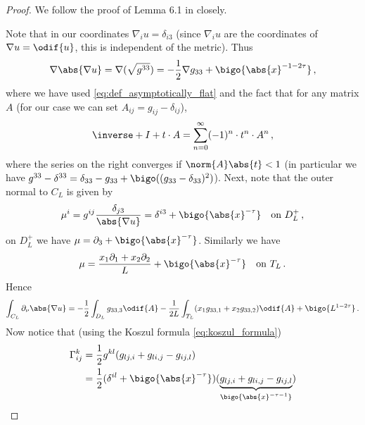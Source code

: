 \documentclass[titlepage,numbers=noenddot,oneside,%
cleardoublepage=empty,paper=a4,fontsize=11pt,%
english,%
]{scrartcl}
\newcommand*{\mathcomma}{\,,}
\newcommand*{\mathfullstop}{\,.}
\begin{document}
\begin{proof}
    We follow the proof of Lemma 6.1 in \cite{brayHarmonicFunctionsMass2019} closely.

    Note that in our coordinates \( \nabla_i u=\delta_{i3} \) (since \( \nabla_i u \) are the coordinates of \( \nabla u=\odif{u} \), this is independent of the metric). Thus
    \begin{equation}
        \nabla\abs{\nabla u}=\nabla (\sqrt{g^{33}})=-\frac{1}{2}\nabla g_{33}+\bigo{\abs{x}^{-1-2\tau}}\mathcomma\label{eq:asymptotic_derivative_of_nabla_u_norm}
    \end{equation}
    where we have used \cref{eq:def_asymptotically_flat} and the fact that for any matrix \( A \) (for our case we can set \( A_{ij}=g_{ij}-\delta_{ij} \)),
    \begin{equation*}
        \inverse+{I+t\cdot A}=\sum_{n=0}^{\infty}(-1)^n\cdot t^n\cdot A^n\mathcomma
    \end{equation*}
    where the series on the right converges if \( \norm{A}\abs{t}<1 \) (in particular we have \( g^{33}-\delta^{33}=\delta_{33}-g_{33}+\bigo((g_{33}-\delta_{33})^2) \)). Next, note that the outer normal to \( C_L \) is given by
    \begin{equation*}
        \mu^i=g^{ij}\frac{\delta_{j3}}{\abs{\nabla u}}=\delta^{i3}+\bigo{\abs{x}^{-\tau}}\quad \text{on \( D_L^+ \)}\mathcomma
    \end{equation*}
    \ie on \( D_L^+ \) we have \( \mu=\partial_3+\bigo{\abs{x}^{-\tau}} \). Similarly we have
    \begin{equation*}
        \mu=\frac{x_1 \partial_1+x_2 \partial_2}{L}+\bigo{\abs{x}^{-\tau}} \quad \text{on \( T_L \)}\mathfullstop
    \end{equation*}
    Hence
    \begin{equation*}
        \int_{C_L} \partial_{\nu}\abs{\nabla u}=-\frac{1}{2}\int_{D_L}g_{33,3}\odif{A}-\frac{1}{2L}\int_{T_L}(x_1 g_{33,1}+x_2 g_{33,2})\odif{A}+\bigo{L^{1-2\tau}}\mathfullstop
    \end{equation*}
    Now notice that (using the Koszul formula \cref{eq:koszul_formula})
    \begin{equation}\label{eq:asymptotic_christoffel_symbols}
        \begin{aligned}[t]
            \Gamma_{ij}^k&=\frac{1}{2}g^{kl}(g_{lj,i}+g_{li,j}-g_{ij,l})\\
            &=\frac{1}{2}(\delta^{il}+\bigo{\abs{x}^{-\tau}})(\underbrace{g_{lj,i}+g_{li,j}-g_{ij,l}}_{\bigo{\abs{x}^{-\tau-1}}})\\

\end{aligned}
\end{equation}
\end{proof}
\end{document}

